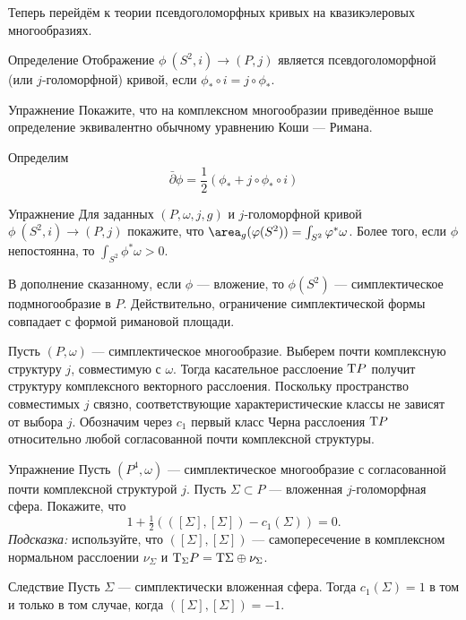 Теперь перейдём к теории псевдоголоморфных кривых на квазикэлеровых многообразиях.

\begin{ex*}{Определение}
Отображение $\phi\:(S^2, i) \to (P, j)$ является псевдоголоморфной
(или $j$-голоморфной) кривой, если  
$\phi_\ast \circ i = j \circ \phi_\ast$.
\end{ex*}

\begin{ex}{Упражнение}\label{10.2.D}
Покажите, что на комплексном многообразии приведённое выше определение
эквивалентно обычному уравнению Коши — Римана.
\end{ex}

Определим 
\[\bar\partial\phi=\frac12(\phi_\ast+j\circ\phi_\ast\circ i)\]

\begin{ex}[(ср. \ref{4.1.A})]{Упражнение}\label{10.2.E}
Для заданных $(P, \omega, j, g)$ и $j$-го\-ло\-морф\-ной кривой $\phi
\: (S^2, i) \to (P, j)$ покажите, что $\area_g (\phi(S^2)) \z=
\int_{S^2}\phi^\ast \omega$. 
Более того, если $\phi$ непостоянна, то $\int_{S^2} \phi^\ast \omega
> 0$.  
\end{ex}

В дополнение сказанному, если $\phi$ — вложение, то $\phi(S^2)$ —
симплектическое подмногообразие в $P$. 
Действительно, ограничение симплектической формы совпадает с формой
римановой площади. 

Пусть $(P, \omega)$ — симплектическое многообразие.
Выберем почти комплексную структуру $j$, совместимую с $\omega$.
Тогда касательное расслоение $\mathrm{T} P$ получит структуру комплексного
векторного расслоения. 
Поскольку пространство совместимых $j$ связно, соответствующие
характеристические классы не зависят от выбора $j$. 
Обозначим через $c_1$ первый класс Черна расслоения $\mathrm{T} P$
относительно любой согласованной почти комплексной структуры. 

\begin{ex}{Упражнение}\label{10.2.F}
Пусть $(P^4, \omega)$ — симплектическое многообразие с согласованной
почти комплексной структурой $j$. 
Пусть $\Sigma \subset P$ — вложенная $j$-голоморфная сфера.
Покажите, что
\[1 +\tfrac12 (([\Sigma], [\Sigma]) - c_1 (\Sigma)) = 0.\]
\emph{Подсказка:} используйте, что $([\Sigma], [\Sigma])$ —
самопересечение в комплексном нормальном расслоении $\nu_\Sigma$ и
$\mathrm{T}_\Sigma P = \mathrm{T}\Sigma \oplus \nu_\Sigma$. 
\end{ex}


\begin{thm*}{Следствие}
Пусть $\Sigma$ — симплектически вложенная сфера.
Тогда $c_1(\Sigma) = 1$ в том и только в том случае, когда $([\Sigma], [\Sigma]) = -1$. 
\end{thm*}

